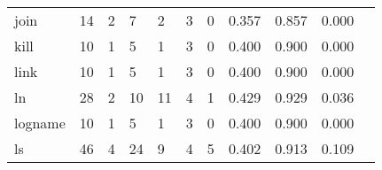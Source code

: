 \begin{longtable}{lp{1.20cm}p{1.20cm}p{1.20cm}p{1.20cm}p{1.20cm}p{1.20cm}p{1.20cm}p{1.20cm}p{1.20cm}p{1.20cm}}
join      &                                    14 &                                                  2 &                                                  7 &                                                  2 &                                                  3 &                                                  0 &                                         0.357 &                                              0.857 &                                              0.000 \\
kill      &                                    10 &                                                  1 &                                                  5 &                                                  1 &                                                  3 &                                                  0 &                                         0.400 &                                              0.900 &                                              0.000 \\
link      &                                    10 &                                                  1 &                                                  5 &                                                  1 &                                                  3 &                                                  0 &                                         0.400 &                                              0.900 &                                              0.000 \\
ln        &                                    28 &                                                  2 &                                                 10 &                                                 11 &                                                  4 &                                                  1 &                                         0.429 &                                              0.929 &                                              0.036 \\
logname   &                                    10 &                                                  1 &                                                  5 &                                                  1 &                                                  3 &                                                  0 &                                         0.400 &                                              0.900 &                                              0.000 \\
ls        &                                    46 &                                                  4 &                                                 24 &                                                  9 &                                                  4 &                                                  5 &                                         0.402 &                                              0.913 &                                              0.109 \\

\end{longtable}
